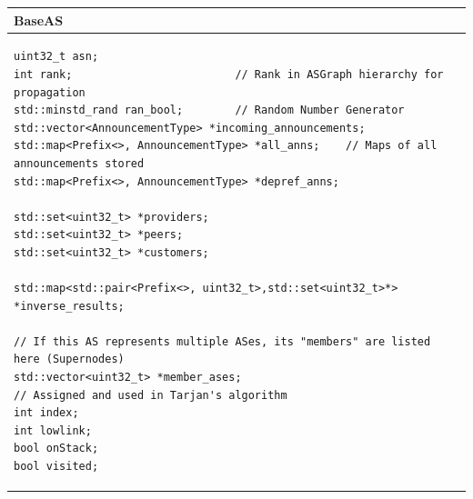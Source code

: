 \documentclass[letterpaper]{article}
\begin{document}
\begin{longtable}[]{@{}l@{}}
\toprule
\textbf{BaseAS}\tabularnewline
\midrule
\endhead
\begin{minipage}[t]{0.97\columnwidth}\raggedright
\begin{verbatim}
uint32_t asn;     
int rank;                         // Rank in ASGraph hierarchy for propagation 
std::minstd_rand ran_bool;        // Random Number Generator
std::vector<AnnouncementType> *incoming_announcements;
std::map<Prefix<>, AnnouncementType> *all_anns;    // Maps of all announcements stored
std::map<Prefix<>, AnnouncementType> *depref_anns;

std::set<uint32_t> *providers; 
std::set<uint32_t> *peers; 
std::set<uint32_t> *customers; 

std::map<std::pair<Prefix<>, uint32_t>,std::set<uint32_t>*> *inverse_results; 

// If this AS represents multiple ASes, its "members" are listed here (Supernodes)  
std::vector<uint32_t> *member_ases;
// Assigned and used in Tarjan's algorithm
int index;
int lowlink;
bool onStack;
bool visited;      
\end{verbatim}
\strut
\end{minipage}\tabularnewline
\bottomrule
\end{longtable}

\nocite{*}

\end{document}

